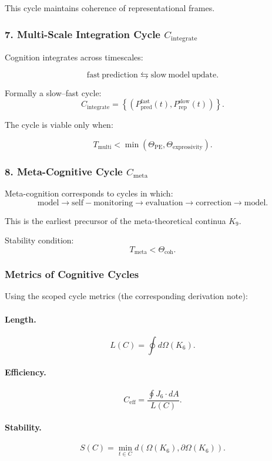 This cycle maintains coherence of representational frames.

\subsubsection{7. Multi-Scale Integration Cycle $C_{\mathrm{integrate}}$}

Cognition integrates across timescales:

\[
 \mathrm{fast\ prediction}
 \leftrightarrows
 \mathrm{slow\ model\ update}.
\]

Formally a slow–fast cycle:
\[
 C_{\mathrm{integrate}} =
 \left\{
   (P_{\mathrm{pred}}^{\mathrm{fast}}(t),
    P_{\mathrm{rep}}^{\mathrm{slow}}(t))
 \right\}.
\]

The cycle is viable only when:

\[
 T_{\mathrm{multi}} < \min(\Theta_{\mathrm{PE}},\Theta_{\mathrm{expressivity}}).
\]

\subsubsection{8. Meta-Cognitive Cycle $C_{\mathrm{meta}}$}

Meta-cognition corresponds to cycles in which:
\[
 \mathrm{model}
 \to
 \mathrm{self-monitoring}
 \to
 \mathrm{evaluation}
 \to
 \mathrm{correction}
 \to
 \mathrm{model}.
\]

This is the earliest precursor of the meta-theoretical continua $K_9$.

Stability condition:
\[
 T_{\mathrm{meta}} < \Theta_{\mathrm{coh}}.
\]

\subsubsection{Metrics of Cognitive Cycles}

Using the scoped cycle metrics (the corresponding derivation note):

\paragraph{Length.}
\[
  L(C)=\oint d\Omega(K_6).
\]

\paragraph{Efficiency.}
\[
  C_{\mathrm{eff}}
    = \frac{\oint J_6\cdot dA}{L(C)}.
\]

\paragraph{Stability.}
\[
  S(C)
  = \min_{t\in C}
    d(\Omega(K_6),\partial\Omega(K_6)).
\]

